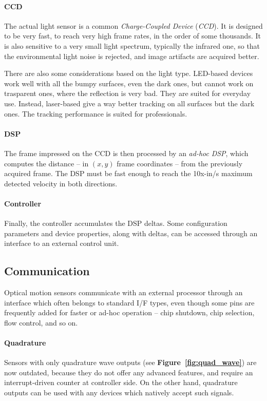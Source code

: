 \documentclass[a4paper,10pt]{article}
\newcommand{\citef}[1]{\textbf{Figure~\ref{#1}}}
\begin{document}
\begin{multicols}{2}
\paragraph{CCD}
The actual light sensor is a common \emph{Charge-Coupled Device}
(\emph{CCD}). It is designed to be very fast, to reach very high frame rates,
in the order of some thousands. It is also sensitive to a very small light
spectrum, typically the infrared one, so that the environmental light noise is
rejected, and image artifacts are acquired better.

There are also some considerations based on the light type. LED-based devices
work well with all the bumpy surfaces, even the dark ones, but cannot work
on trasparent ones, where the reflection is very bad. They are suited for
everyday use.
Instead, laser-based give a way better tracking on all surfaces but the dark
ones. The tracking performance is suited for professionals.


\paragraph{DSP}
The frame impressed on the CCD is then processed by an \emph{ad-hoc}
\emph{DSP}, which computes the distance -- in $(x,y)$ frame coordinates --
from the previously acquired frame. The DSP must be fast enough to reach the
10x-in/s maximum detected velocity in both directions.


\paragraph{Controller}
Finally, the controller accumulates the DSP deltas. Some configuration
parameters and device properties, along with deltas, can be accessed through
an interface to an external control unit.


\subsection{Communication}

Optical motion sensors communicate with an external processor through an
interface which often belongs to standard I/F types, even though some pins
are frequently added for faster or ad-hoc operation -- chip shutdown, chip
selection, flow control, and so on.


\paragraph{Quadrature}
Sensors with only quadrature wave outputs (see \citef{fig:quad_wave}) are now
outdated, because they do not offer any advanced features, and require an
interrupt-driven counter at controller side. On the other hand, quadrature
outputs can be used with any devices which natively accept such signals.



\end{multicols}
\end{document}
